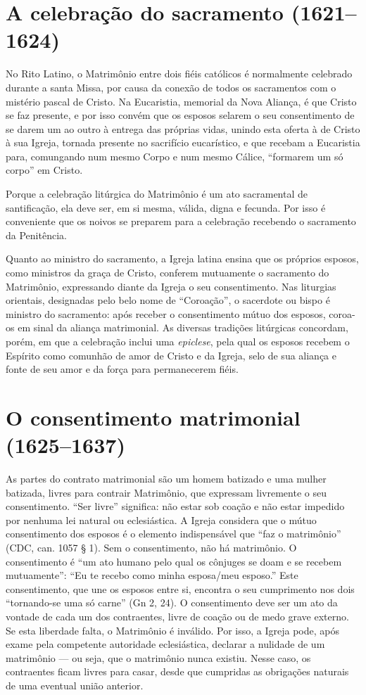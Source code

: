 \section{A celebração do sacramento (1621--1624)}

No Rito Latino, o Matrimônio entre dois fiéis católicos é normalmente celebrado durante a santa Missa, por causa da conexão de todos os sacramentos com o mistério pascal de Cristo. Na Eucaristia, memorial da Nova Aliança, é que Cristo se faz presente, e por isso convém que os esposos selarem o seu consentimento de se darem um ao outro à entrega das próprias vidas, unindo esta oferta à de Cristo à sua Igreja, tornada presente no sacrifício eucarístico, e que recebam a Eucaristia para, comungando num mesmo Corpo e num mesmo Cálice, ``formarem um só corpo'' em Cristo.

Porque a celebração litúrgica do Matrimônio é um ato sacramental de santificação, ela deve ser, em si mesma, válida, digna e fecunda. Por isso é conveniente que os noivos se preparem para a celebração recebendo o sacramento da Penitência.

Quanto ao ministro do sacramento, a Igreja latina ensina que os próprios esposos, como ministros da graça de Cristo, conferem mutuamente o sacramento do Matrimônio, expressando diante da Igreja o seu consentimento. Nas liturgias orientais, designadas pelo belo nome de ``Coroação'', o sacerdote ou bispo é ministro do sacramento: após receber o consentimento mútuo dos esposos, coroa-os em sinal da aliança matrimonial. As diversas tradições litúrgicas concordam, porém, em que a celebração inclui uma \emph{epiclese}, pela qual os esposos recebem o Espírito como comunhão de amor de Cristo e da Igreja, selo de sua aliança e fonte de seu amor e da força para permanecerem fiéis.

\section{O consentimento matrimonial (1625--1637)}

As partes do contrato matrimonial são um homem batizado e uma mulher batizada, livres para contrair Matrimônio, que expressam livremente o seu consentimento. ``Ser livre'' significa: não estar sob coação e não estar impedido por nenhuma lei natural ou eclesiástica. A Igreja considera que o mútuo consentimento dos esposos é o elemento indispensável que ``faz o matrimônio'' (CDC, can. 1057 § 1). Sem o consentimento, não há matrimônio. O consentimento é ``um ato humano pelo qual os cônjuges se doam e se recebem mutuamente'': ``Eu te recebo como minha esposa/meu esposo.'' Este consentimento, que une os esposos entre si, encontra o seu cumprimento nos dois ``tornando-se uma só carne'' (Gn 2, 24). O consentimento deve ser um ato da vontade de cada um dos contraentes, livre de coação ou de medo grave externo. Se esta liberdade falta, o Matrimônio é inválido. Por isso, a Igreja pode, após exame pela competente autoridade eclesiástica, declarar a nulidade de um matrimônio --- ou seja, que o matrimônio nunca existiu. Nesse caso, os contraentes ficam livres para casar, desde que cumpridas as obrigações naturais de uma eventual união anterior.

